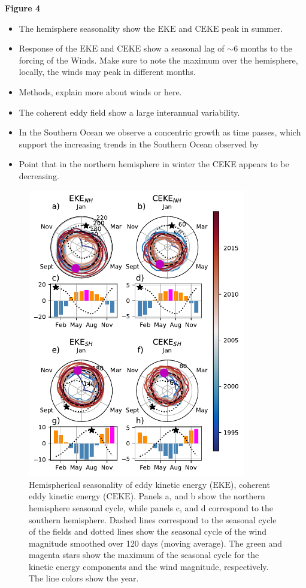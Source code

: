 \documentclass[draft,linenumbers]{agujournal2019}
\newcommand{\EKE}{\textrm{EKE}}
\newcommand{\CEKE}{\textrm{CEKE}}
\begin{document}
	\textbf{Figure 4}
	\begin{itemize}
		\item The hemisphere seasonality show the  $\EKE$ and $\CEKE$ peak in summer.
		\item Response of the $\EKE$ and $\CEKE$ show a seasonal lag of $\sim$6 months to the forcing of the Winds. Make sure to note the maximum over the hemisphere, locally, the winds may peak in different months. 
		\item Methods, explain more about winds or here. 
		\item The coherent eddy field show a large interannual variability.
		\item In the Southern Ocean we observe a concentric growth as time passes, which support the increasing trends in the Southern Ocean observed by \citep{Hogg_Recent_2015,Martinez_TKE_2019,Martinez_Kinetic_2021}
		\item Point that in the northern hemisphere in winter the CEKE appears to be decreasing.
	\end{itemize}

	\begin{figure}
	    \centering
	    \includegraphics[width=95mm]{figures/All_polar_plots.pdf}
	    \caption{Hemispherical seasonality of eddy kinetic energy ($\EKE$), coherent eddy kinetic energy ($\CEKE$). Panels a, and b show the northern hemisphere seasonal cycle, while panels c, and d correspond to the southern hemisphere. Dashed lines correspond to the seasonal cycle of the fields and dotted lines show the seasonal cycle of the wind magnitude smoothed over 120 days (moving average). The green and magenta stars show the maximum of the seasonal cycle for the kinetic energy components and the wind magnitude, respectively. The line colors show the year.}
	    \label{fig:eddy_energy_polar}
	\end{figure}
	
\end{document}
